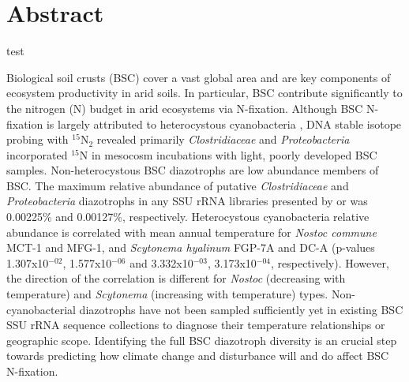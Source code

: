 \section{Abstract}

test

Biological soil crusts (BSC) cover a vast global area and are key components
of ecosystem productivity in arid soils. In particular, BSC contribute
significantly to the nitrogen (N) budget in arid ecosystems via N-fixation.
Although BSC N-fixation is largely attributed to heterocystous cyanobacteria
\citep{Yeager, 14766579, Yeager_2012}, DNA stable isotope probing with
$^{15}$N$_{2}$ revealed primarily \textit{Clostridiaceae} and
\textit{Proteobacteria} incorporated $^{15}$N in mesocosm incubations with
light, poorly developed BSC samples. Non-heterocystous BSC diazotrophs are
low abundance members of BSC. The maximum relative abundance of putative
\textit{Clostridiaceae} and \textit{Proteobacteria} diazotrophs in any SSU
rRNA libraries presented by \citet{Garcia_Pichel_2013} or \citet{Steven_2013}
was 0.00225\% and 0.00127\%, respectively. Heterocystous cyanobacteria
relative abundance is correlated with mean annual temperature for
\textit{Nostoc commune} MCT-1 and MFG-1, and \textit{Scytonema hyalinum}
FGP-7A and DC-A (p-values 1.307x10$^{-02}$, 1.577x10$^{-06}$ and
3.332x10$^{-03}$, 3.173x10$^{-04}$, respectively). However, the direction of
the correlation is different for \textit{Nostoc} (decreasing with
temperature) and \textit{Scytonema} (increasing with temperature) types.
Non-cyanobacterial diazotrophs have not been sampled sufficiently yet in
existing BSC SSU rRNA sequence collections to diagnose their temperature
relationships or geographic scope. Identifying the full BSC diazotroph
diversity is an crucial step towards predicting how climate change and
disturbance will and do affect BSC N-fixation.
